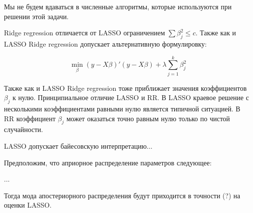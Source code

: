 \documentclass[pdftex,12pt,a4paper]{article}
\begin{document}
Мы не будем вдаваться в численные алгоритмы, которые используются при решении этой задачи.


Ridge regression отличается от LASSO ограничением $\sum \beta_j^2\leq c$. 
Также как и LASSO Ridge regression допускает альтернативную формулировку:

\begin{equation}
\min_{\beta} (y-X\beta)'(y-X\beta)+\lambda \sum_{j=1}^{k} \beta_j^2
\end{equation}

Также как и LASSO Ridge regression тоже приближает значения коэффициентов $\beta_j$ к нулю. 
Принципиальное отличие LASSO и RR. 
В LASSO краевое решение с несколькими коэффициентами равными нулю является типичной ситуацией. 
В RR коэффициент $\beta_j$ может оказаться точно равным нулю только по чистой случайности. 


LASSO допускает байесовскую интерпретацию...

Предположим, что априорное распределение параметров следующее:

...


Тогда мода апостериорного распределения будут приходится в точности (?) на оценки LASSO.


\end{document}
